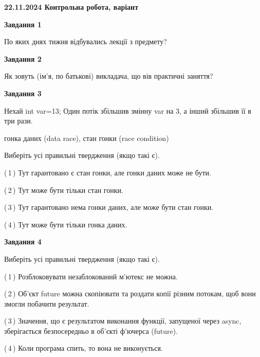 \documentclass[12pt, ukrainian]{article}
\begin{document}
\begin {large}

\textbf{22.11.2024 Контрольна робота, варіант  }\par


{

\begin{center}
\textbf{Завдання 1}
\end{center}

По яких днях тижня відбувались лекції з предмету?


\begin{center}
\textbf{Завдання 2}
\end{center}

Як зовуть (ім'я, по батькові) викладача, що вів практичні заняття?


\begin{center}
\textbf{Завдання 3}
\end{center}

Нехай int var=13; Один потік збільшив змінну var на 3, а інший збільшив її в три рази.

гонка даних (data race), стан гонки (race condition)

Виберіть усі правильні твердження (якщо такі є).\par
\vspace{2mm}
(\,1\,) Тут гарантовано є стан гонки, але гонки даних може не бути.%

(\,2\,) Тут може бути тільки стан гонки.%

(\,3\,) Тут гарантовано нема гонки даних, але може бути стан гонки.%

(\,4\,) Тут може бути тільки гонка даних.%


\begin{center}
\textbf{Завдання 4}
\end{center}

Виберіть усі правильні твердження (якщо такі є).\par
\vspace{2mm}

(\,1\,) Розблоковувати незаблокований м’ютекс не можна.%

(\,2\,) Об’єкт future можна скопіювати та роздати копії різним потокам, щоб вони змогли побачити результат.%

(\,3\,) Значення, що є результатом виконання функції, запущеної через async, зберігається безпосередньо в об’єкті ф’ючерса (future).%

(\,4\,) Коли програма спить, то вона не виконується.%


}
\end{large}
\end{document}
